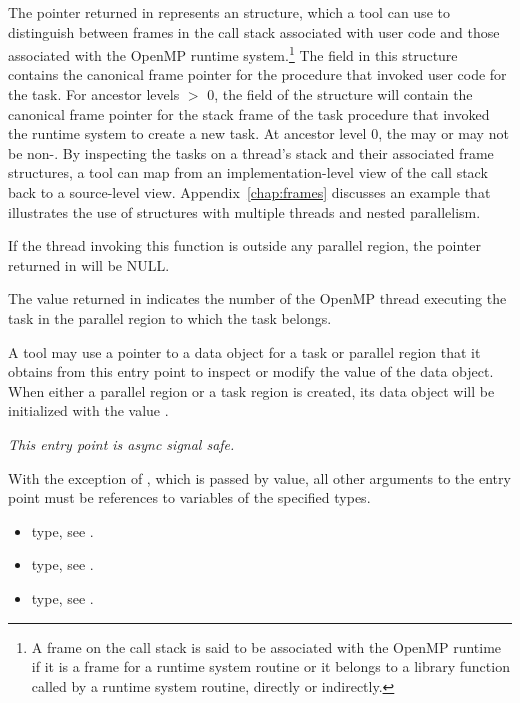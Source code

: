 The pointer returned in  represents an
 structure, which
a tool can use to distinguish between frames in the call stack 
associated with user code and those associated with
the OpenMP runtime system.\footnote{A frame 
on the call stack is said to be associated with 
the OpenMP runtime if it is a frame for a runtime system
routine or it belongs to a library function called by a runtime
system routine, directly or indirectly.} 
The  field in this structure contains the
canonical frame pointer for the procedure that invoked 
user code for the task. 
For ancestor levels $>$ 0, the 
 field of
the structure will contain the canonical frame pointer for the 
stack frame of the task procedure that invoked the runtime system to
create a new task. At ancestor level 0, the  may or
may not be non-. 
By inspecting the tasks on a thread's stack and their associated frame
structures,
a tool can map from an implementation-level view of the call stack
back to a source-level view.
Appendix~\ref{chap:frames} discusses an example that
illustrates the use of  structures with multiple
threads and nested parallelism.

If the thread invoking this function is outside any parallel region,
the pointer returned in  will be NULL.  

The value returned in  indicates the number of the
OpenMP thread executing the task in the parallel region to which the
task belongs.

A tool may use a pointer to a data object for a task or parallel
region that it obtains from this entry point to inspect or modify the
value of the data object.  When either a parallel region or a task
region is created, its data object will be initialized with the value
.

{\em This entry point is async signal safe.}

\constraints
With the exception of , which is passed by
value, all other arguments to the entry point must be references
to variables of the specified types.

\crossreferences
\begin{itemize}
\item {} type, see .
\item {} type, see .
\item {} type, see
  .
\end{itemize}

